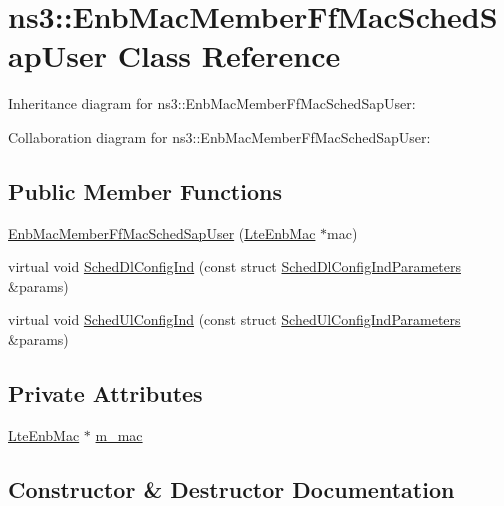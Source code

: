 \hypertarget{classns3_1_1EnbMacMemberFfMacSchedSapUser}{}\section{ns3\+:\+:Enb\+Mac\+Member\+Ff\+Mac\+Sched\+Sap\+User Class Reference}
\label{classns3_1_1EnbMacMemberFfMacSchedSapUser}


Inheritance diagram for ns3\+:\+:Enb\+Mac\+Member\+Ff\+Mac\+Sched\+Sap\+User\+:


Collaboration diagram for ns3\+:\+:Enb\+Mac\+Member\+Ff\+Mac\+Sched\+Sap\+User\+:
\subsection*{Public Member Functions}
\begin{DoxyCompactItemize}
\item 
\hyperlink{classns3_1_1EnbMacMemberFfMacSchedSapUser_aae7d7bf40fb6deb6599e64354473c8e0}{Enb\+Mac\+Member\+Ff\+Mac\+Sched\+Sap\+User} (\hyperlink{classns3_1_1LteEnbMac}{Lte\+Enb\+Mac} $\ast$mac)
\item 
virtual void \hyperlink{classns3_1_1EnbMacMemberFfMacSchedSapUser_a9fcfa51c58c86fcea64fc77f91037033}{Sched\+Dl\+Config\+Ind} (const struct \hyperlink{structns3_1_1FfMacSchedSapUser_1_1SchedDlConfigIndParameters}{Sched\+Dl\+Config\+Ind\+Parameters} \&params)
\item 
virtual void \hyperlink{classns3_1_1EnbMacMemberFfMacSchedSapUser_a3cfab49a622c8bc5365420575b279060}{Sched\+Ul\+Config\+Ind} (const struct \hyperlink{structns3_1_1FfMacSchedSapUser_1_1SchedUlConfigIndParameters}{Sched\+Ul\+Config\+Ind\+Parameters} \&params)
\end{DoxyCompactItemize}
\subsection*{Private Attributes}
\begin{DoxyCompactItemize}
\item 
\hyperlink{classns3_1_1LteEnbMac}{Lte\+Enb\+Mac} $\ast$ \hyperlink{classns3_1_1EnbMacMemberFfMacSchedSapUser_a723e1207d4f44be8a723054a722dd6a1}{m\+\_\+mac}
\end{DoxyCompactItemize}


\subsection{Constructor \& Destructor Documentation}
